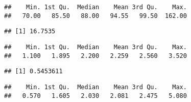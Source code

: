 \documentclass[
]{article}
\newenvironment{Shaded}{\begin{snugshade}}{\end{snugshade}}
\newcommand{\DataTypeTok}[1]{\textcolor[rgb]{0.13,0.29,0.53}{#1}}
\newcommand{\KeywordTok}[1]{\textcolor[rgb]{0.13,0.29,0.53}{\textbf{#1}}}
\newcommand{\NormalTok}[1]{#1}
\newcommand{\OperatorTok}[1]{\textcolor[rgb]{0.81,0.36,0.00}{\textbf{#1}}}
\newcommand{\StringTok}[1]{\textcolor[rgb]{0.31,0.60,0.02}{#1}}
\begin{document}
\begin{verbatim}
##    Min. 1st Qu.  Median    Mean 3rd Qu.    Max. 
##   70.00   85.50   88.00   94.55   99.50  162.00
\end{verbatim}

\begin{Shaded}
\end{Shaded}

\begin{verbatim}
## [1] 16.7535
\end{verbatim}

\begin{Shaded}
\end{Shaded}

\begin{verbatim}
##    Min. 1st Qu.  Median    Mean 3rd Qu.    Max. 
##   1.100   1.895   2.200   2.259   2.560   3.520
\end{verbatim}

\begin{Shaded}
\end{Shaded}

\begin{verbatim}
## [1] 0.5453611
\end{verbatim}

\begin{Shaded}
\end{Shaded}

\begin{verbatim}
##    Min. 1st Qu.  Median    Mean 3rd Qu.    Max. 
##   0.570   1.605   2.030   2.081   2.475   5.080
\end{verbatim}

\begin{Shaded}
\end{Shaded}
\end{document}
